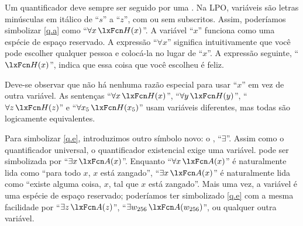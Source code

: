 
Um quantificador deve sempre ser seguido por uma . Na LPO, variáveis são letras minúsculas em itálico de \textquotedblleft $s$\textquotedblright{} a \textquotedblleft $z$\textquotedblright{}, com ou sem subscritos. Assim, poderíamos simbolizar \cref*{q.a} como \textquotedblleft $\forall x\, \atom{H}{x}$\textquotedblright{}. A variável \textquotedblleft $x$\textquotedblright{} funciona como uma espécie de espaço reservado. A expressão \textquotedblleft $\forall x$\textquotedblright{} significa intuitivamente que você pode escolher qualquer pessoa e colocá-la no lugar de \textquotedblleft $x$\textquotedblright{}. A expressão seguinte, \textquotedblleft $\atom{H}{x}$\textquotedblright{}, indica que essa coisa que você escolheu é feliz.



Deve-se observar que não há nenhuma razão especial para usar \textquotedblleft $x$\textquotedblright{} em vez de outra variável. As sentenças \textquotedblleft $\forall x\, \atom{H}{x}$\textquotedblright{}, \textquotedblleft $\forall y\, \atom{H}{y}$\textquotedblright{}, \textquotedblleft $\forall z\, \atom{H}{z}$\textquotedblright{} e \textquotedblleft $\forall x_5\, \atom{H}{x_5}$\textquotedblright{} usam variáveis diferentes, mas todas são logicamente equivalentes.

Para simbolizar \cref{q.e}, introduzimos outro símbolo novo: o , \textquotedblleft $\exists$\textquotedblright{}. Assim como o quantificador universal, o quantificador existencial exige uma variável.  pode ser simbolizada por \textquotedblleft $\exists x\,\atom{A}{x}$\textquotedblright{}. Enquanto \textquotedblleft $\forall x\,\atom{A}{x}$\textquotedblright{} é naturalmente lida como \textquotedblleft para todo $x$, $x$ está zangado\textquotedblright{}, \textquotedblleft $\exists x\,\atom{A}{x}$\textquotedblright{} é naturalmente lida como \textquotedblleft existe alguma coisa, $x$, tal que $x$ está zangado\textquotedblright{}. Mais uma vez, a variável é uma espécie de espaço reservado; poderíamos ter simbolizado \cref*{q.e} com a mesma facilidade por \textquotedblleft $\exists z\, \atom{A}{z}$\textquotedblright{}, \textquotedblleft $\exists w_{256}\, \atom{A}{w_{256}}$\textquotedblright{}, ou qualquer outra variável.


